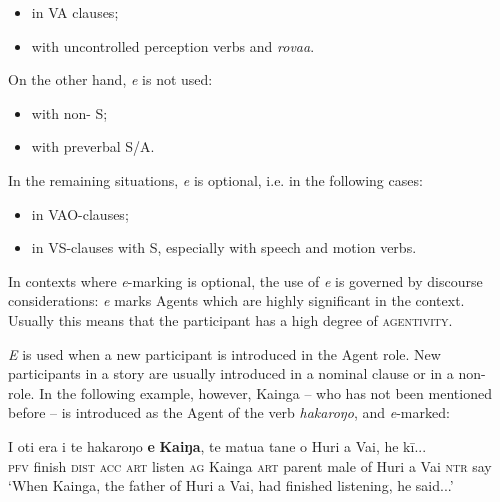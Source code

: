 {\begin{itemize}
\item 
in VA clauses;

\item 
with uncontrolled perception verbs and \textit{rova{\ꞌ}a}.

\end{itemize}

On the other hand, \textit{e} is not used:

\begin{itemize}
\item 
with non- S;

\item 
with preverbal S/A.

\end{itemize}

In the remaining situations, \textit{e} is optional, i.e. in the following cases:

\begin{itemize}
\item 
in VAO-clauses;

\item 
in VS-clauses with  S, especially with speech and motion verbs.

\end{itemize}

In contexts where \textit{e}{}-marking is optional, the use of \textit{e} is governed by discourse considerations: \textit{e} marks Agents which are highly significant in the context. Usually this means that the participant has a high degree of \textsc{agentivity}. 

\textit{E} is used when a new participant is introduced in the Agent role. New participants in a story are usually introduced in a nominal clause or in a non- role. In the following example, however, Kainga – who has not been mentioned before – is introduced as the Agent of the verb \textit{hakaroŋo}, and \textit{e}\nobreakdash-marked:

\ea\label{ex:8.19}
\gll I oti era i te hakaroŋo \textbf{e} \textbf{Kaiŋa}, te matu{\ꞌ}a tane o Huri {\ꞌ}a Vai, he kī...\\
\textsc{pfv} finish \textsc{dist} \textsc{acc} \textsc{art} listen \textsc{ag} Kainga \textsc{art} parent male of Huri a Vai \textsc{ntr} say\\

\glt
‘When Kainga, the father of Huri a Vai, had finished listening, he said...’ \textstyleExampleref{[R304.011]} 
\z

}
